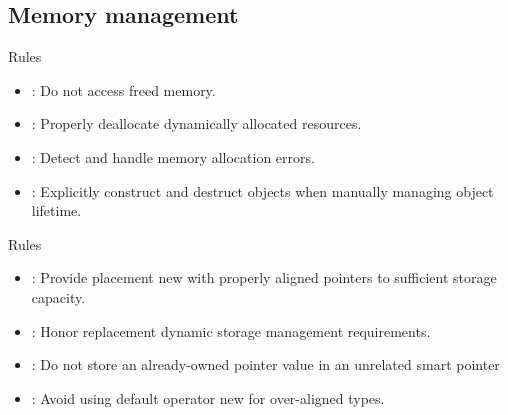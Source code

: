 \subsection{Memory management}

\begin{frame}[t]{Rules}
\begin{itemize}
  \item {}: 
        Do not access freed memory.
  \vfill
  \item {}: 
        Properly deallocate dynamically allocated resources.
  \vfill
  \item {}: 
        Detect and handle memory allocation errors.
  \vfill
  \item {}: 
        Explicitly construct and destruct objects when manually managing object lifetime.
  \vfill
\end{itemize}
\end{frame}

\begin{frame}[t]{Rules}
\begin{itemize}
  \item {}: 
        Provide placement new with properly aligned pointers to sufficient storage capacity.
  \vfill
  \item {}: 
        Honor replacement dynamic storage management requirements.
  \vfill
  \item {}: 
        Do not store an already-owned pointer value in an unrelated smart pointer
  \vfill
  \item {}: 
        Avoid using default operator new for over-aligned types.
\end{itemize}
\end{frame}
